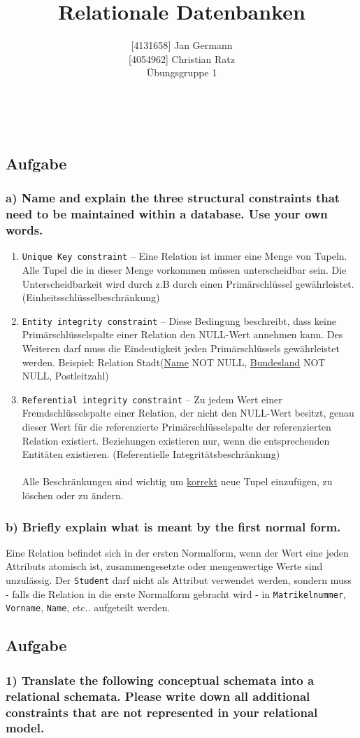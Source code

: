 \documentclass[11pt,a4paper,DIV=9]{scrartcl}
\author{{[}4131658{]} Jan Germann \\{[}4054962{]} Christian Ratz\\Übungsgruppe 1}
\title{Relationale Datenbanken}
\newcounter{temp}
\newcommand{\aufgabe}[1]{
  \setcounter{temp}{\value{subsection}}
  \setcounter{subsection}{#1}
  \addtocounter{subsection}{-1}
  \subsection{Aufgabe}
  \setcounter{subsection}{\value{temp}}
}
\newcommand{\teil}[2][]{
  \subsubsection*{#2) #1}
}
\renewcommand{\author}[1]{\renewcommand{\author}{#1}}
\renewcommand{\title}[1]{\renewcommand{\title}{#1}}
\newcommand{\makehomeworktitle}{
  \begin{minipage}[t]{6.5cm}
    \sf{\author}
  \end{minipage}
  \begin{minipage}[t]{6.5cm}
    \begin{flushright}
      \sf{\title\\\today}
    \end{flushright}
  \end{minipage}
  \\[0.2cm]
  \begin{center}
    \sf{
      \color{blue}{
        \LARGE{Aufgabenblatt \blattnr}
      }
    }
  \end{center}
  \vspace{0.1cm}
}
\begin{document}
\makehomeworktitle

\aufgabe{1}
\teil[Name and explain the three structural constraints that need to be maintained within a database. Use your own words.]{a}
 \begin{enumerate}
    \item \texttt{Unique Key constraint} -- Eine Relation ist immer eine Menge von Tupeln. Alle Tupel die in dieser Menge vorkommen m\"ussen unterscheidbar sein. Die Unterscheidbarkeit wird durch z.B durch einen Prim\"arschl\"ussel gew\"ahrleistet. (Einheitsschl\"usselbeschr\"ankung)
    \item \texttt{Entity integrity constraint} -- Diese Bedingung beschreibt, dass keine Prim\"arschl\"usselspalte einer Relation den NULL-Wert annehmen kann. Des Weiteren darf muss die Eindeutigkeit jeden Prim\"arschl\"ussels gew\"ahrleistet werden. Beispiel: Relation Stadt(\underline{Name} NOT NULL, \underline{Bundesland} NOT NULL, Postleitzahl)
    \item \texttt{Referential integrity constraint} -- Zu jedem Wert einer Fremdschl\"usselspalte einer Relation, der nicht den NULL-Wert besitzt, genau dieser Wert f\"ur die referenzierte Prim\"arschl\"usselspalte der referenzierten Relation existiert. Beziehungen existieren nur, wenn die entsprechenden Entit\"aten existieren. (Referentielle Integrit\"atsbeschr\"ankung)
    \\\\ Alle Beschr\"ankungen sind wichtig um \underline{korrekt} neue Tupel einzuf\"ugen, zu l\"oschen oder zu \"andern.
  \end{enumerate}
\teil[Briefly explain what is meant by the first normal form.]{b}
Eine Relation befindet sich in der ersten Normalform, wenn der Wert eine jeden Attributs atomisch ist, zusammengesetzte oder mengenwertige Werte sind unzul\"assig. Der \texttt{Student} darf nicht als Attribut verwendet werden, sondern muss - falls die Relation in die erste Normalform gebracht wird - in \texttt{Matrikelnummer}, \texttt{Vorname}, \texttt{Name}, etc.. aufgeteilt werden.

\newpage  
\aufgabe{2}
  \teil[Translate the following conceptual schemata into a relational schemata. Please write down all additional constraints that are not represented in your relational model.]{1}
\end{document}
